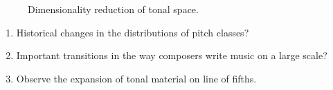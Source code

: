 \begin{frame}{\insertsectionhead}
\begin{figure}
{\begin{subfigure}[t]{.3\textwidth}
      \end{subfigure}
    }
    \hfill
    \caption{Dimensionality reduction of tonal space.}
    \label{}
  \end{figure}


\end{frame}


\begin{frame}{\insertsectionhead}

  \begin{enumerate}
    \item<1-> \alert{Historical changes} in the distributions of pitch classes?
    \item<2-> Important \alert{transitions} in the way composers write music on a large scale?
    \item<3-> Observe the \alert{expansion} of tonal material on line of fifths.
  \end{enumerate}

\end{frame}

